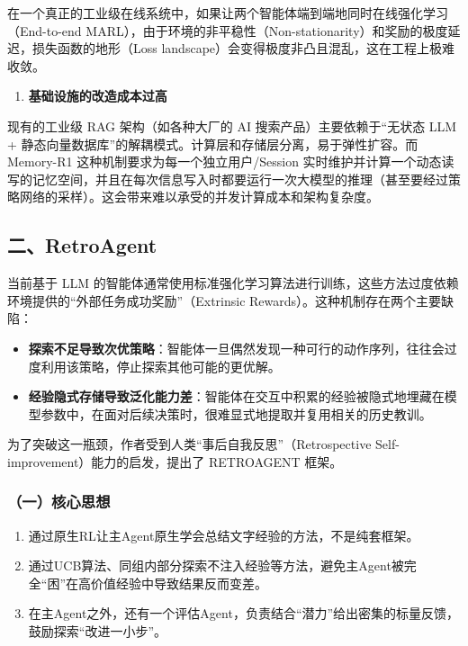 在一个真正的工业级在线系统中，如果让两个智能体端到端地同时在线强化学习（End-to-end MARL），由于环境的非平稳性（Non-stationarity）和奖励的极度延迟，损失函数的地形（Loss landscape）会变得极度非凸且混乱，这在工程上极难收敛。

\begin{enumerate}
\def\labelenumi{\arabic{enumi}.}
\setcounter{enumi}{3}
\tightlist
\item
  \textbf{基础设施的改造成本过高}
\end{enumerate}

现有的工业级 RAG 架构（如各种大厂的 AI 搜索产品）主要依赖于``无状态 LLM + 静态向量数据库''的解耦模式。计算层和存储层分离，易于弹性扩容。而 Memory-R1 这种机制要求为每一个独立用户/Session 实时维护并计算一个动态读写的记忆空间，并且在每次信息写入时都要运行一次大模型的推理（甚至要经过策略网络的采样）。这会带来难以承受的并发计算成本和架构复杂度。

\hypertarget{ux4e8cretroagent}{%
\subsection{二、RetroAgent}\label{ux4e8cretroagent}}

当前基于 LLM 的智能体通常使用标准强化学习算法进行训练，这些方法过度依赖环境提供的``外部任务成功奖励''（Extrinsic Rewards）。这种机制存在两个主要缺陷：

\begin{itemize}
\tightlist
\item
  \textbf{探索不足导致次优策略}：智能体一旦偶然发现一种可行的动作序列，往往会过度利用该策略，停止探索其他可能的更优解。
\item
  \textbf{经验隐式存储导致泛化能力差}：智能体在交互中积累的经验被隐式地埋藏在模型参数中，在面对后续决策时，很难显式地提取并复用相关的历史教训。
\end{itemize}

为了突破这一瓶颈，作者受到人类``事后自我反思''（Retrospective Self-improvement）能力的启发，提出了 RETROAGENT 框架。

\hypertarget{ux4e00ux6838ux5fc3ux601dux60f3-11}{%
\subsubsection{（一）核心思想}\label{ux4e00ux6838ux5fc3ux601dux60f3-11}}

\begin{enumerate}
\def\labelenumi{\arabic{enumi}.}
\item
  通过原生RL让主Agent原生学会总结文字经验的方法，不是纯套框架。
\item
  通过UCB算法、同组内部分探索不注入经验等方法，避免主Agent被完全``困''在高价值经验中导致结果反而变差。
\item
  在主Agent之外，还有一个评估Agent，负责结合``潜力''给出密集的标量反馈，鼓励探索``改进一小步''。
\end{enumerate}


